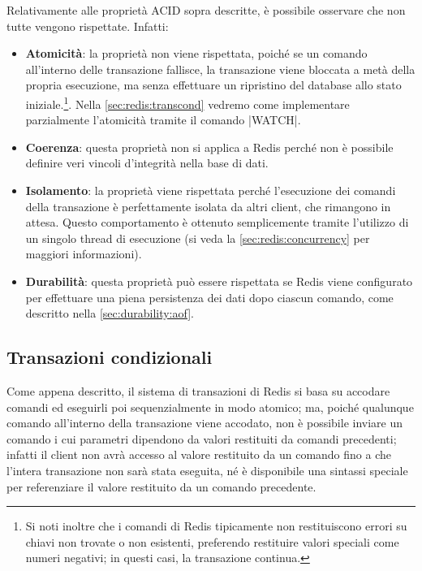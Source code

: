 Relativamente alle proprietà ACID sopra descritte, è possibile osservare che non tutte vengono
rispettate. Infatti:

\begin{itemize}
	\item \textbf{Atomicità}: la proprietà non viene rispettata, poiché se un comando all'interno
	delle transazione fallisce, la transazione viene bloccata a metà della propria esecuzione, ma
	senza effettuare un ripristino del database allo stato iniziale.\footnote{Si noti inoltre che i
	comandi di Redis tipicamente non restituiscono errori su chiavi non trovate o non esistenti,
	preferendo restituire valori speciali come numeri negativi; in questi casi, la transazione
	continua.}. Nella \autoref{sec:redis:transcond} vedremo come implementare parzialmente
	l'atomicità tramite il comando \cverb|WATCH|.

	\item \textbf{Coerenza}: questa proprietà non si applica a Redis perché non è possibile definire 
	veri vincoli d'integrità nella base di dati.

	\item \textbf{Isolamento}: la proprietà viene rispettata perché l'esecuzione dei comandi
	della transazione è perfettamente isolata da altri client, che rimangono in attesa. Questo
	comportamento è ottenuto semplicemente tramite l'utilizzo di un singolo thread di esecuzione (si
	veda la \autoref{sec:redis:concurrency} per maggiori informazioni).

	\item \textbf{Durabilità}: questa proprietà può essere rispettata se Redis viene configurato
	per effettuare una piena persistenza dei dati dopo ciascun comando, come descritto nella
	\autoref{sec:durability:aof}.
\end{itemize}


\subsection{Transazioni condizionali}
\label{sec:redis:transcond}

Come appena descritto, il sistema di transazioni di Redis si basa su accodare comandi ed eseguirli
poi sequenzialmente in modo atomico; ma, poiché qualunque comando all'interno della transazione
viene accodato, non è possibile inviare un comando i cui parametri dipendono da valori restituiti da
comandi precedenti; infatti il client non avrà accesso al valore restituito da un comando fino a che
l'intera transazione non sarà stata eseguita, né è disponibile una sintassi speciale per
referenziare il valore restituito da un comando precedente.

